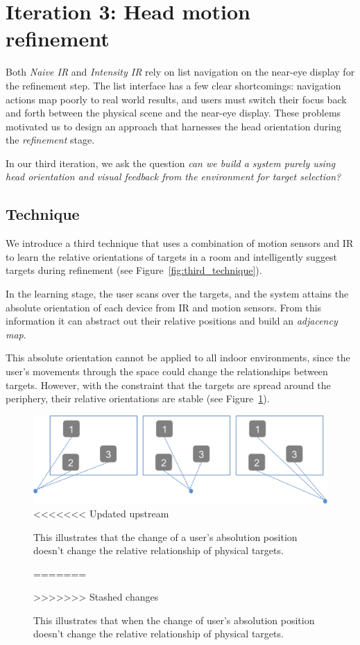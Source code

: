 \section{Iteration 3: Head motion refinement}
\label{sec:iteration-3:-head}

Both {\em Naive IR} and {\em Intensity IR} rely on list navigation on the
near-eye display for the refinement step. The list interface has a few clear
shortcomings: navigation actions map poorly to real world results, and
users must switch their focus back and forth between the physical scene and the
near-eye display. These problems motivated us to design an approach that
harnesses the head orientation during the {\em refinement} stage.

In our third iteration, we ask the question {\em can we build a system purely
using head orientation and visual feedback from the environment for target
selection?}

\subsection{Technique}

We introduce a third technique that uses a combination of motion sensors and IR
to learn the relative orientations of targets in a room and intelligently
suggest targets during refinement (see Figure~\ref{fig:third_technique}).

In the learning stage, the user scans over the targets, and the system attains
the absolute orientation of each device from IR and motion sensors. From this
information it can abstract out their relative positions and build an {\em
adjacency map}.

This absolute orientation cannot be applied to all indoor environments, since
the user’s movements through the space could change the relationships between
targets. However, with the constraint that the targets are spread around the
periphery, their relative orientations are stable (see
Figure~\ref{fig:third_principle}).

\begin{figure}[t]
\centering
\includegraphics[width=1\columnwidth]{figures/third_principle.png}
<<<<<<< Updated upstream
\caption{This illustrates that the change of a user's absolution position
doesn't change the relative relationship of physical targets.}
=======
\caption{This illustrates that when the change of user's absolution position
doesn't change the relative relationship of physical targets.}
>>>>>>> Stashed changes
\label{fig:third_principle}
\end{figure}

